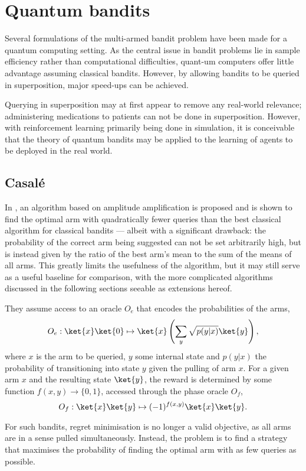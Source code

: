 \chapter{Quantum bandits}
\label{chap:qbandits}

Several formulations of the multi-armed bandit problem have been made for a quantum computing setting.
As the central issue in bandit problems lie in sample efficiency rather than computational difficulties, quant-um computers offer little advantage assuming classical bandits.
However, by allowing bandits to be queried in superposition, major speed-ups can be achieved.

Querying in superposition may at first appear to remove any real-world relevance; administering medications to patients can not be done in superposition.
However, with reinforcement learning primarily being done in simulation, it is conceivable that the theory of quantum bandits may be applied to the learning of agents to be deployed in the real world.



\section{Casalé}
In \cite{casale2020}, an algorithm based on amplitude amplification is proposed and is shown to find the optimal arm with quadratically fewer queries than the best classical algorithm for classical bandits — albeit with a significant drawback: the probability of the correct arm being suggested can not be set arbitrarily high, but is instead given by the ratio of the best arm's mean to the sum of the means of all arms.
This greatly limits the usefulness of the algorithm, but it may still serve as a useful baseline for comparison, with the more complicated algorithms discussed in the following sections seeable as extensions hereof.

They assume access to an oracle $O_e$ that encodes the probabilities of the arms,
\begin{equation}
    O_e: \ket{x}\ket{0} \mapsto \ket{x} \left(\sum_y \sqrt{p(y|x)} \ket{y}\right),
\end{equation}
where $x$ is the arm to be queried, $y$ some internal state and $p(y|x)$ the probability of transitioning into state $y$ given the pulling of arm $x$.
For a given arm $x$ and the resulting state $\ket{y}$, the reward is determined by some function $f(x,y) \to \{0, 1\}$, accessed through the phase oracle $O_f$,
\begin{equation}
    O_f :  \ket{x}\ket{y} \mapsto (-1)^{f(x,y)} \ket{x}\ket{y}.
\end{equation}

For such bandits, regret minimisation is no longer a valid objective, as all arms are in a sense pulled simultaneously.
Instead, the problem is to find a strategy that maximises the probability of finding the optimal arm with as few queries as possible.